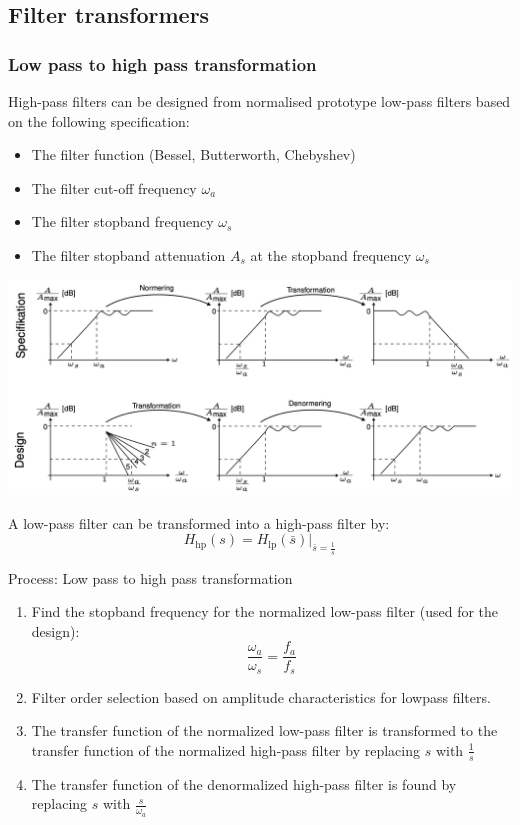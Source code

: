 \subsection{Filter transformers}
\subsubsection{Low pass to high pass transformation}
High-pass filters can be designed from normalised prototype low-pass filters based on the following specification:
\begin{itemize}
  \item The filter function (Bessel, Butterworth, Chebyshev) 
  \item The filter cut-off frequency $\omega_{a}$
  \item The filter stopband frequency $\omega_{s}$
  \item The filter stopband attenuation $A_{s}$ at the stopband frequency $\omega_{s}$
\end{itemize}

\begin{center}
  \includegraphics[width=\textwidth]{Images/LP-to-HP.png} 
\end{center}
A low-pass filter can be transformed into a high-pass filter by:
$$H_{\text{hp}}(s)=H_{\text{lp}}(\bar{s})|_{\bar{s}=\frac{1}{s}}$$

Process: Low pass to high pass transformation
\begin{enumerate}
  \item Find the stopband frequency for the normalized low-pass filter (used for the design):$$\frac{\omega_{a}}{\omega_{s}}=\frac{f_{a}}{f_{s}}$$
  \item Filter order selection based on amplitude characteristics for lowpass filters.
  \item The transfer function of the normalized low-pass filter is transformed to the transfer function of the normalized high-pass filter by replacing $s$ with $\frac{1}{s}$
  \item The transfer function of the denormalized high-pass filter is found by replacing $s$ with $\frac{s}{\omega_{a}}$
\end{enumerate}


